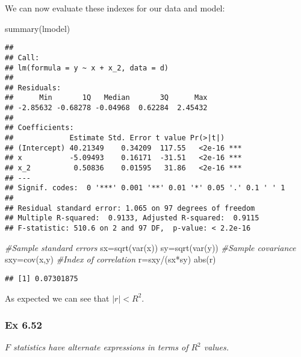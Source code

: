 \documentclass[
]{article}
\newenvironment{Shaded}{\begin{snugshade}}{\end{snugshade}}
\newcommand{\CommentTok}[1]{\textcolor[rgb]{0.56,0.35,0.01}{\textit{#1}}}
\newcommand{\FunctionTok}[1]{\textcolor[rgb]{0.00,0.00,0.00}{#1}}
\newcommand{\NormalTok}[1]{#1}
\newcommand{\OtherTok}[1]{\textcolor[rgb]{0.56,0.35,0.01}{#1}}
\newcommand{\SpecialCharTok}[1]{\textcolor[rgb]{0.00,0.00,0.00}{#1}}
\begin{document}
We can now evaluate these indexes for our data and model:

\begin{Shaded}
\begin{Highlighting}[]
\FunctionTok{summary}\NormalTok{(lmodel)}
\end{Highlighting}
\end{Shaded}

\begin{verbatim}
## 
## Call:
## lm(formula = y ~ x + x_2, data = d)
## 
## Residuals:
##      Min       1Q   Median       3Q      Max 
## -2.85632 -0.68278 -0.04968  0.62284  2.45432 
## 
## Coefficients:
##             Estimate Std. Error t value Pr(>|t|)    
## (Intercept) 40.21349    0.34209  117.55   <2e-16 ***
## x           -5.09493    0.16171  -31.51   <2e-16 ***
## x_2          0.50836    0.01595   31.86   <2e-16 ***
## ---
## Signif. codes:  0 '***' 0.001 '**' 0.01 '*' 0.05 '.' 0.1 ' ' 1
## 
## Residual standard error: 1.065 on 97 degrees of freedom
## Multiple R-squared:  0.9133, Adjusted R-squared:  0.9115 
## F-statistic: 510.6 on 2 and 97 DF,  p-value: < 2.2e-16
\end{verbatim}

\begin{Shaded}
\begin{Highlighting}[]
\CommentTok{\#Sample standard errors }
\NormalTok{sx}\OtherTok{=}\FunctionTok{sqrt}\NormalTok{(}\FunctionTok{var}\NormalTok{(x))}
\NormalTok{sy}\OtherTok{=}\FunctionTok{sqrt}\NormalTok{(}\FunctionTok{var}\NormalTok{(y))}
\CommentTok{\#Sample covariance}
\NormalTok{sxy}\OtherTok{=}\FunctionTok{cov}\NormalTok{(x,y)}
\CommentTok{\#Index of correlation }
\NormalTok{r}\OtherTok{=}\NormalTok{sxy}\SpecialCharTok{/}\NormalTok{(sx}\SpecialCharTok{*}\NormalTok{sy)}
\FunctionTok{abs}\NormalTok{(r)}
\end{Highlighting}
\end{Shaded}

\begin{verbatim}
## [1] 0.07301875
\end{verbatim}

As expected we can see that \(|r|<R^2\).

\hypertarget{ex-6.52}{%
\subsubsection{Ex 6.52}\label{ex-6.52}}

\emph{\(F\) statistics have alternate expressions in terms of \(R^2\)
values.}
\end{document}
